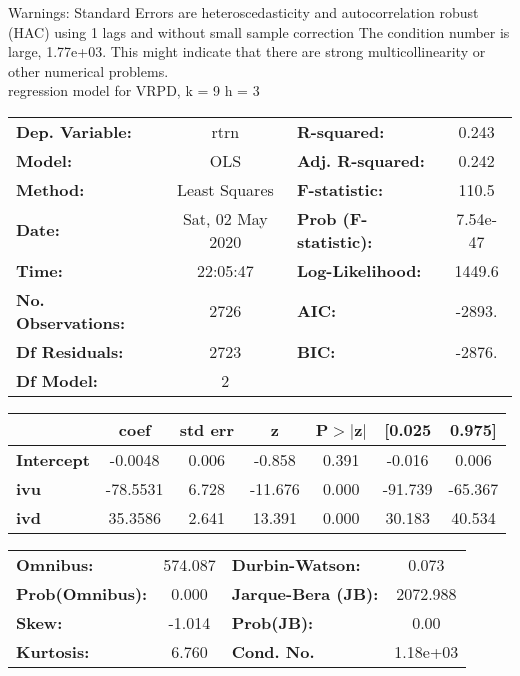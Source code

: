 Warnings: \newline
 [1] Standard Errors are heteroscedasticity and autocorrelation robust (HAC) using 1 lags and without small sample correction \newline
 [2] The condition number is large, 1.77e+03. This might indicate that there are \newline
 strong multicollinearity or other numerical problems.\\ 

regression model for VRPD, k = 9 h = 3\begin{center}
\begin{tabular}{lclc}
\toprule
\textbf{Dep. Variable:}    &       rtrn       & \textbf{  R-squared:         } &     0.243   \\
\textbf{Model:}            &       OLS        & \textbf{  Adj. R-squared:    } &     0.242   \\
\textbf{Method:}           &  Least Squares   & \textbf{  F-statistic:       } &     110.5   \\
\textbf{Date:}             & Sat, 02 May 2020 & \textbf{  Prob (F-statistic):} &  7.54e-47   \\
\textbf{Time:}             &     22:05:47     & \textbf{  Log-Likelihood:    } &    1449.6   \\
\textbf{No. Observations:} &        2726      & \textbf{  AIC:               } &    -2893.   \\
\textbf{Df Residuals:}     &        2723      & \textbf{  BIC:               } &    -2876.   \\
\textbf{Df Model:}         &           2      & \textbf{                     } &             \\
\bottomrule
\end{tabular}
\begin{tabular}{lcccccc}
                   & \textbf{coef} & \textbf{std err} & \textbf{z} & \textbf{P$> |$z$|$} & \textbf{[0.025} & \textbf{0.975]}  \\
\midrule
\textbf{Intercept} &      -0.0048  &        0.006     &    -0.858  &         0.391        &       -0.016    &        0.006     \\
\textbf{ivu}       &     -78.5531  &        6.728     &   -11.676  &         0.000        &      -91.739    &      -65.367     \\
\textbf{ivd}       &      35.3586  &        2.641     &    13.391  &         0.000        &       30.183    &       40.534     \\
\bottomrule
\end{tabular}
\begin{tabular}{lclc}
\textbf{Omnibus:}       & 574.087 & \textbf{  Durbin-Watson:     } &    0.073  \\
\textbf{Prob(Omnibus):} &   0.000 & \textbf{  Jarque-Bera (JB):  } & 2072.988  \\
\textbf{Skew:}          &  -1.014 & \textbf{  Prob(JB):          } &     0.00  \\
\textbf{Kurtosis:}      &   6.760 & \textbf{  Cond. No.          } & 1.18e+03  \\
\bottomrule
\end{tabular}
\end{center}

